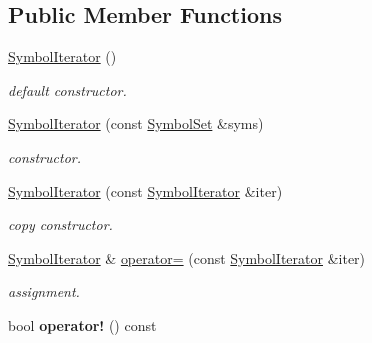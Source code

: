 \subsection*{Public Member Functions}
\begin{DoxyCompactItemize}
\item 
\hypertarget{classzbar_1_1_symbol_iterator_ae7a2bdbb9e615c78aeb331463092913f}{
\hyperlink{classzbar_1_1_symbol_iterator_ae7a2bdbb9e615c78aeb331463092913f}{SymbolIterator} ()}
\label{classzbar_1_1_symbol_iterator_ae7a2bdbb9e615c78aeb331463092913f}

\begin{DoxyCompactList}\small\item\em default constructor. \end{DoxyCompactList}\item 
\hypertarget{classzbar_1_1_symbol_iterator_a883abd50bc17b8cf3e1b72ef94cd82cc}{
\hyperlink{classzbar_1_1_symbol_iterator_a883abd50bc17b8cf3e1b72ef94cd82cc}{SymbolIterator} (const \hyperlink{classzbar_1_1_symbol_set}{SymbolSet} \&syms)}
\label{classzbar_1_1_symbol_iterator_a883abd50bc17b8cf3e1b72ef94cd82cc}

\begin{DoxyCompactList}\small\item\em constructor. \end{DoxyCompactList}\item 
\hypertarget{classzbar_1_1_symbol_iterator_a057d1874ec28e0d65cfc8316ecd765c0}{
\hyperlink{classzbar_1_1_symbol_iterator_a057d1874ec28e0d65cfc8316ecd765c0}{SymbolIterator} (const \hyperlink{classzbar_1_1_symbol_iterator}{SymbolIterator} \&iter)}
\label{classzbar_1_1_symbol_iterator_a057d1874ec28e0d65cfc8316ecd765c0}

\begin{DoxyCompactList}\small\item\em copy constructor. \end{DoxyCompactList}\item 
\hypertarget{classzbar_1_1_symbol_iterator_a6da4716f0d388475f66b15b95aa0845c}{
\hyperlink{classzbar_1_1_symbol_iterator}{SymbolIterator} \& \hyperlink{classzbar_1_1_symbol_iterator_a6da4716f0d388475f66b15b95aa0845c}{operator=} (const \hyperlink{classzbar_1_1_symbol_iterator}{SymbolIterator} \&iter)}
\label{classzbar_1_1_symbol_iterator_a6da4716f0d388475f66b15b95aa0845c}

\begin{DoxyCompactList}\small\item\em assignment. \end{DoxyCompactList}\item 
\hypertarget{classzbar_1_1_symbol_iterator_ab32af5eca570cd878211a52f41fda5cc}{
bool {\bfseries operator!} () const }
\label{classzbar_1_1_symbol_iterator_ab32af5eca570cd878211a52f41fda5cc}


\end{DoxyCompactItemize}
